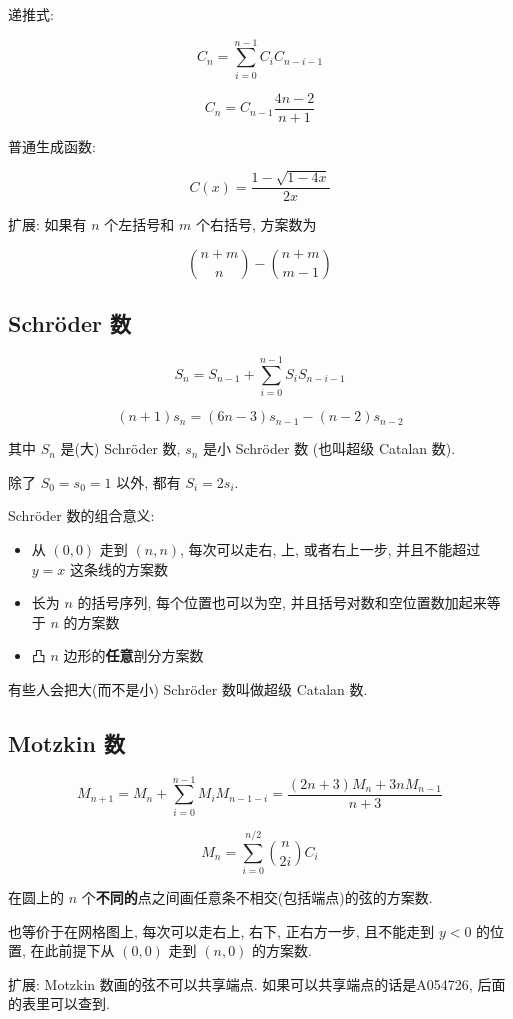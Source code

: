 递推式: 

\[
    C_n = \sum_{i = 0} ^ {n - 1} C_i C_{n - i - 1}
\]

\[
    C_n = C_{n - 1} \frac {4n - 2} {n + 1}
\]

普通生成函数:

\[
    C(x) = \frac{1 - \sqrt {1 - 4 x}}{2 x}
\]

扩展: 如果有 \(n\) 个左括号和 \(m\) 个右括号, 方案数为

\[
    \binom{n + m}{n} - \binom{n + m}{m - 1}
\]

\subsection{Schr\"oder 数}
\label{sec:schroder-数}

\[
    S_n = S_{n-1} + \sum_{i = 0} ^ {n - 1} S_i S_{n - i - 1}
\]

\[
    (n + 1)s_n = (6n - 3)s_{n - 1} - (n - 2) s_{n - 2}
\]

其中 \(S_n\) 是(大) Schr\"oder 数, \(s_n\) 是小 Schr\"oder 数 (也叫超级 Catalan 数).

除了 \(S_0 = s_0 = 1\) 以外, 都有 \(S_i = 2s_i\).

Schr\"oder 数的组合意义:

\begin{itemize}
    \item 从 \((0, 0)\) 走到 \((n, n)\), 每次可以走右, 上, 或者右上一步, 并且不能超过 \(y=x\) 这条线的方案数
    \item 长为 \(n\) 的括号序列, 每个位置也可以为空, 并且括号对数和空位置数加起来等于 \(n\) 的方案数
    \item 凸 \(n\) 边形的\textbf{任意}剖分方案数
\end{itemize}

有些人会把大(而不是小) Schr\"oder 数叫做超级 Catalan 数.

\subsection{Motzkin 数}
\label{sec:motzkin-数}

\[
    M_{n + 1} = M_n + \sum_{i = 0} ^ {n - 1} M_i M_{n - 1 - i} = \frac{(2n + 3)M_n + 3n M_{n - 1}}{n + 3}
\]

\[
    M_n = \sum_{i = 0} ^ {n/2} \binom{n}{2i} C_i
\]

在圆上的 \(n\) 个\textbf{不同的}点之间画任意条不相交(包括端点)的弦的方案数.

也等价于在网格图上, 每次可以走右上, 右下, 正右方一步, 且不能走到 \(y<0\) 的位置, 在此前提下从 \((0, 0)\) 走到 \((n, 0)\) 的方案数.

扩展: Motzkin 数画的弦不可以共享端点. 如果可以共享端点的话是A054726, 后面的表里可以查到.

